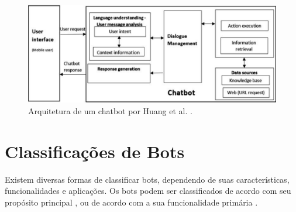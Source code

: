 \begin{figure}[!htb]
\centering
\includegraphics[width=12cm]{huang-arquitetura.pdf}
\caption{Arquitetura de um chatbot por Huang et al. \cite{huang2021}.}
\label{fig:bot-arch}
\end{figure}



\section{Classificações de Bots}
\label{sec:class-bots}

Existem diversas formas de classificar bots, dependendo de suas características, funcionalidades e aplicações. Os bots podem ser classificados de acordo com seu propósito principal \cite{lebeuf2019}, ou de acordo com a sua funcionalidade primária \cite{seering2018}.

